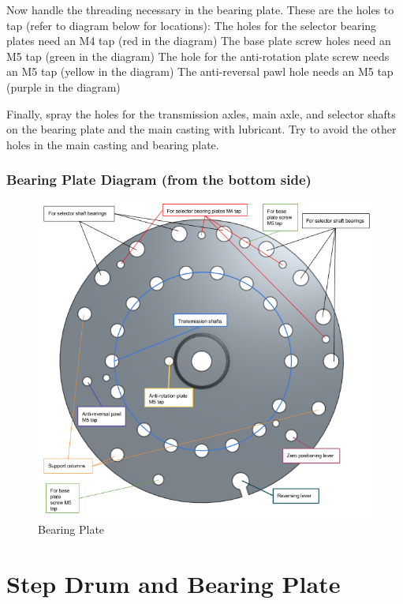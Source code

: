 \documentclass[openany]{book}
\begin{document}
Now handle the threading necessary in the bearing plate. These are the holes to tap (refer to diagram below for locations):
The holes for the selector bearing plates need an M4 tap (red in the diagram)
The base plate screw holes need an M5 tap (green in the diagram)
The hole for the anti-rotation plate screw needs an M5 tap (yellow in the diagram)
The anti-reversal pawl hole needs an M5 tap (purple in the diagram)

Finally, spray the holes for the transmission axles, main axle, and selector shafts on the bearing plate and the main casting with lubricant. Try to avoid the other holes in the main casting and bearing plate.


\subsection{Bearing Plate Diagram (from the bottom side)}
\begin{figure}[!ht]
	\centering
	\includegraphics[width=\textwidth]{images/image25.png}
	\caption{Bearing Plate}
	\label{fig:image25}	
\end{figure}



\chapter{Step Drum and Bearing Plate}
\end{document}
